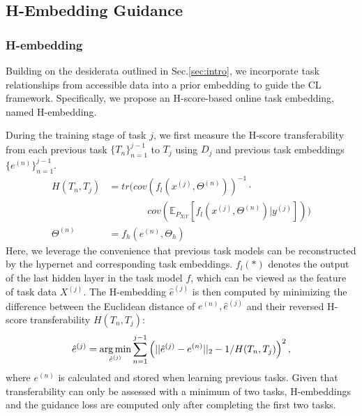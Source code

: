 \subsection{H-Embedding Guidance}
\label{sec:H-embed}
\subsubsection{H-embedding}
Building on the desiderata outlined in Sec.\ref{sec:intro}, we incorporate task relationships from accessible data into a prior embedding to guide the CL framework. Specifically, we propose an H-score-based online task embedding, named H-embedding. 

During the training stage of task $j$, we first measure the H-score transferability from each previous task $\{T_n\}_{n=1}^{j-1}$ to $T_j$ using $D_j$ and previous task embeddings $\{e^{(n)}\}_{n=1}^{j-1}$.
\begin{align}
    \label{eqn:hscore}
    H(T_n, T_j) &= tr(cov(f_l(x^{(j)}, \Theta^{(n)}))^{-1}\cdot \\
    & \ \ \ \ \ \ \ \ \ \ \ \ \ \ \ \ \ \ cov(\mathbb{E}_{P_{X|Y}}[f_l(x^{(j)}, \Theta^{(n)})|y^{(j)}]))\nonumber \\
    \Theta^{(n)} &= f_h(e^{(n)}, \Theta_h) \nonumber
\end{align}
Here, we leverage the convenience that previous task models can be reconstructed by the hypernet and corresponding task embeddings. $f_l(*)$ denotes the output of the last hidden layer in the task model $f$, which can be viewed as the feature of task data $X^{(j)}$. The H-embedding $\hat{e}^{(j)}$ is then computed by minimizing the difference between the Euclidean distance of $e^{(n)}, \hat{e}^{(j)}$ and their reversed H-score transferability $H(T_n, T_j)$:
\begin{align}
    \hat{e}^{(j)} = \operatorname*{arg\,min}_{\hat{e}^{(j)}} \sum_{n=1}^{j-1} \left(||\hat{e}^{(j)} - e^{(n)}||_2 - 1/H(T_n, T_j)\right)^2,
    \label{eqn:emb}
\end{align}
where $e^{(n)}$ is calculated and stored when learning previous tasks.
Given that transferability can only be assessed with a minimum of two tasks, H-embeddings and the guidance loss are computed only after completing the first two tasks.

